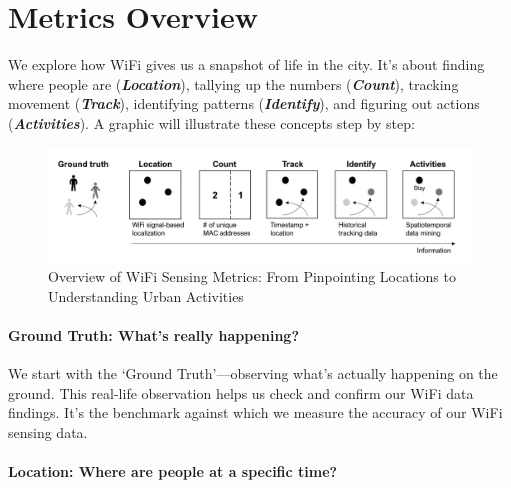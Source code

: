 \documentclass[
  letterpaper,
]{scrbook}
\begin{document}
\chapter{Metrics Overview}\label{metrics-overview}

We explore how WiFi gives us a snapshot of life in the city. It's about
finding where people are (\emph{\textbf{Location}}), tallying up the
numbers (\emph{\textbf{Count}}), tracking movement
(\emph{\textbf{Track}}), identifying patterns
(\emph{\textbf{Identify}}), and figuring out actions
(\emph{\textbf{Activities}}). A graphic will illustrate these concepts
step by step:

\begin{figure}[H]

{\centering \includegraphics{content/material/ch4/metric-overview.png}

}

\caption{Overview of WiFi Sensing Metrics: From Pinpointing Locations to
Understanding Urban Activities}

\end{figure}%

\subsubsection*{\texorpdfstring{\textbf{Ground Truth: What's really
happening?}}{Ground Truth: What's really happening?}}\label{ground-truth-whats-really-happening}

We start with the `Ground Truth'---observing what's actually happening
on the ground. This real-life observation helps us check and confirm our
WiFi data findings. It's the benchmark against which we measure the
accuracy of our WiFi sensing data.

\subsubsection*{\texorpdfstring{\textbf{Location: Where are people at a
specific
time?}}{Location: Where are people at a specific time?}}\label{location-where-are-people-at-a-specific-time}
\end{document}
